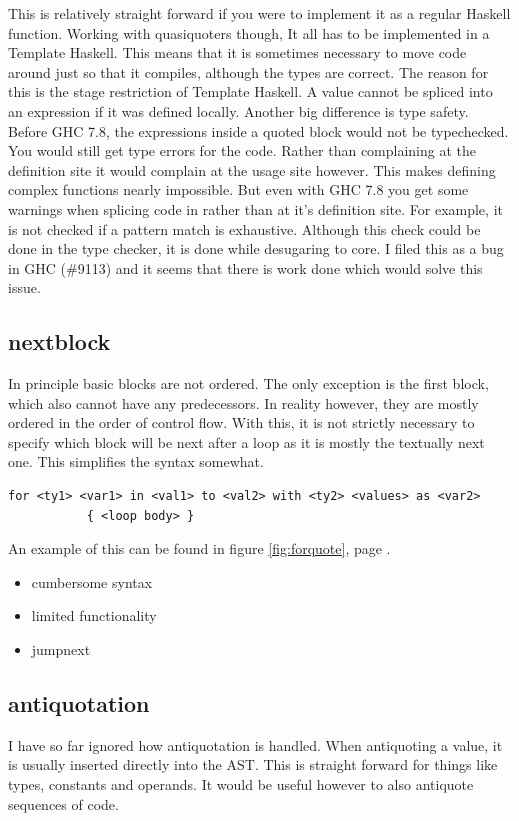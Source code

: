 \documentclass[a4paper,bibliography=totocnumbered,parskip,headsepline]{scrbook}
\begin{document}
This is relatively straight forward if you were to implement it as a regular Haskell function.
Working with quasiquoters though, It all has to be implemented in a Template Haskell.
This means that it is sometimes necessary to move code around just so that it compiles, although the types are correct.
The reason for this is the stage restriction of Template Haskell.
A value cannot be spliced into an expression if it was defined locally.
Another big difference is type safety.
Before GHC 7.8, the expressions inside a quoted block would not be typechecked.
You would still get type errors for the code.
Rather than complaining at the definition site it would complain at the usage site however.
This makes defining complex functions nearly impossible.
But even with GHC 7.8 you get some warnings when splicing code in rather than at it's definition site.
For example, it is not checked if a pattern match is exhaustive.
Although this check could be done in the type checker, it is done while desugaring to core.
I filed this as a bug in GHC (\#9113) and it seems that there is work done which would solve this issue.

\subsection{nextblock}
In principle basic blocks are not ordered.
The only exception is the first block, which also cannot have any predecessors.
In reality however, they are mostly ordered in the order of control flow.
With this, it is not strictly necessary to specify which block will be next after a loop as it is mostly the textually next one.
This simplifies the syntax somewhat.

\begin{lstlisting}[numbers=none]
for <ty1> <var1> in <val1> to <val2> with <ty2> <values> as <var2>
           { <loop body> }
\end{lstlisting}

An example of this can be found in figure \ref{fig:forquote}, page \pageref{fig:forquote}.

\begin{itemize}[noitemsep]
\item cumbersome syntax
\item limited functionality
\item jumpnext
\end{itemize}

\subsection{antiquotation}
I have so far ignored how antiquotation is handled.
When antiquoting a value, it is usually inserted directly into the AST.
This is straight forward for things like types, constants and operands.
It would be useful however to also antiquote sequences of code.
\end{document}
